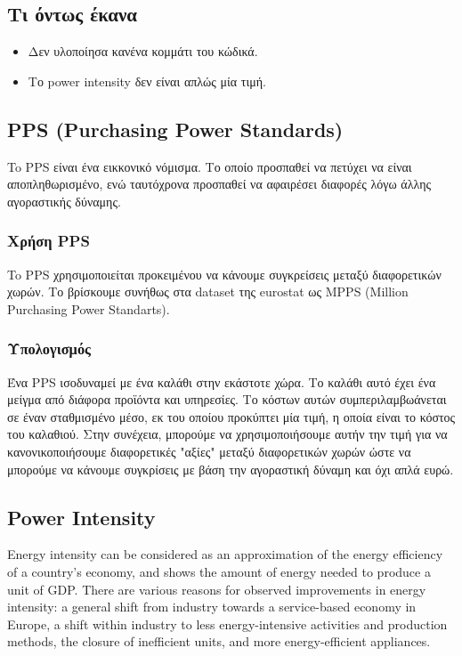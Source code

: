 \documentclass[a4paper,twoside,10pt]{article}
\begin{document}
\subsection{Τι όντως έκανα}
\begin{itemize}
	\item Δεν υλοποίησα κανένα κομμάτι του κώδικά. 
	\item Το power intensity δεν είναι απλώς μία τιμή. 
\end{itemize}
\subsection{PPS (Purchasing Power Standards)}
To PPS είναι ένα εικκονικό νόμισμα. Το οποίο προσπαθεί να πετύχει να είναι αποπληθωρισμένο, ενώ ταυτόχρονα προσπαθεί να αφαιρέσει διαφορές λόγω άλλης αγοραστικής δύναμης.
\subsubsection{Χρήση PPS}
To PPS χρησιμοποιείται προκειμένου να κάνουμε συγκρείσεις μεταξύ διαφορετικών χωρών. Το βρίσκουμε συνήθως στα dataset της eurostat ως MPPS (Million Purchasing Power Standarts).
\subsubsection{Υπολογισμός}
Ένα PPS ισοδυναμεί με ένα καλάθι στην εκάστοτε χώρα. Το καλάθι αυτό έχει ένα μείγμα από διάφορα προϊόντα και υπηρεσίες. Το κόστων αυτών συμπεριλαμβωάνεται σε έναν σταθμισμένο μέσο, εκ του οποίου προκύπτει μία τιμή, η οποία είναι το κόστος του καλαθιού. Στην συνέχεια, μπορούμε να χρησιμοποιήσουμε αυτήν την τιμή για να κανονικοποιήσουμε διαφορετικές "αξίες" μεταξύ διαφορετικών χωρών ώστε να μπορούμε να κάνουμε συγκρίσεις με βάση την αγοραστική δύναμη και όχι απλά ευρώ. 
\subsection{Power Intensity}

Energy intensity can be considered as an approximation of the energy efficiency of a country’s economy, and shows the amount of energy needed to produce a unit of GDP. There are various reasons for observed improvements in energy intensity: a general shift from industry towards a service-based economy in Europe, a shift within industry to less energy-intensive activities and production methods, the closure of inefficient units, and more energy-efficient appliances.
\end{document}
